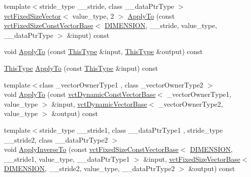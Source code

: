 \begin{DoxyCompactItemize}
\item 
{\footnotesize template$<$stride\-\_\-type \-\_\-\-\_\-stride, class \-\_\-\-\_\-data\-Ptr\-Type $>$ }\\\hyperlink{classvct_fixed_size_vector}{vct\-Fixed\-Size\-Vector}$<$ value\-\_\-type, 2 $>$ \hyperlink{classvct_matrix_rotation2_base_a2bc7baf6dc98626913c07c3f04cadb54}{Apply\-To} (const \hyperlink{classvct_fixed_size_const_vector_base}{vct\-Fixed\-Size\-Const\-Vector\-Base}$<$ \hyperlink{classvct_matrix_rotation2_base_ac10279ed12ec787b1a4833ea02771348acefb9855f54f0cfd782e785c9083e592}{D\-I\-M\-E\-N\-S\-I\-O\-N}, \-\_\-\-\_\-stride, value\-\_\-type, \-\_\-\-\_\-data\-Ptr\-Type $>$ \&input) const 
\item 
void \hyperlink{classvct_matrix_rotation2_base_a469ac3c9d4096e008972938dbf8e00bf}{Apply\-To} (const \hyperlink{classvct_matrix_rotation2_base_a47ffeef2ddecede4b16bcc88fb432ff5}{This\-Type} \&input, \hyperlink{classvct_matrix_rotation2_base_a47ffeef2ddecede4b16bcc88fb432ff5}{This\-Type} \&output) const 
\item 
\hyperlink{classvct_matrix_rotation2_base_a47ffeef2ddecede4b16bcc88fb432ff5}{This\-Type} \hyperlink{classvct_matrix_rotation2_base_abd982d8904da149f4fb22ad8e8f8f79e}{Apply\-To} (const \hyperlink{classvct_matrix_rotation2_base_a47ffeef2ddecede4b16bcc88fb432ff5}{This\-Type} \&input) const 
\item 
{\footnotesize template$<$class \-\_\-vector\-Owner\-Type1 , class \-\_\-vector\-Owner\-Type2 $>$ }\\void \hyperlink{classvct_matrix_rotation2_base_aff4459bd033c0f20c63712369b79fa82}{Apply\-To} (const \hyperlink{classvct_dynamic_const_vector_base}{vct\-Dynamic\-Const\-Vector\-Base}$<$ \-\_\-vector\-Owner\-Type1, value\-\_\-type $>$ \&input, \hyperlink{classvct_dynamic_vector_base}{vct\-Dynamic\-Vector\-Base}$<$ \-\_\-vector\-Owner\-Type2, value\-\_\-type $>$ \&output) const 
\item 
{\footnotesize template$<$stride\-\_\-type \-\_\-\-\_\-stride1, class \-\_\-\-\_\-data\-Ptr\-Type1 , stride\-\_\-type \-\_\-\-\_\-stride2, class \-\_\-\-\_\-data\-Ptr\-Type2 $>$ }\\void \hyperlink{classvct_matrix_rotation2_base_a1afd4d3ae2b8d01092ec5585ce489ddb}{Apply\-Inverse\-To} (const \hyperlink{classvct_fixed_size_const_vector_base}{vct\-Fixed\-Size\-Const\-Vector\-Base}$<$ \hyperlink{classvct_matrix_rotation2_base_ac10279ed12ec787b1a4833ea02771348acefb9855f54f0cfd782e785c9083e592}{D\-I\-M\-E\-N\-S\-I\-O\-N}, \-\_\-\-\_\-stride1, value\-\_\-type, \-\_\-\-\_\-data\-Ptr\-Type1 $>$ \&input, \hyperlink{classvct_fixed_size_vector_base}{vct\-Fixed\-Size\-Vector\-Base}$<$ \hyperlink{classvct_matrix_rotation2_base_ac10279ed12ec787b1a4833ea02771348acefb9855f54f0cfd782e785c9083e592}{D\-I\-M\-E\-N\-S\-I\-O\-N}, \-\_\-\-\_\-stride2, value\-\_\-type, \-\_\-\-\_\-data\-Ptr\-Type2 $>$ \&output) const 

\end{DoxyCompactItemize}
